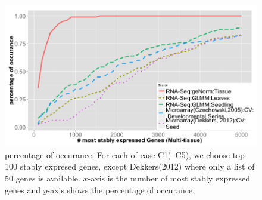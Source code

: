\documentclass[11pt, a4paper]{article}
\begin{document}

 \begin{figure}[h!]
 	\begin{center}
 		\includegraphics[scale=0.5]{Figures/rankVSrank_RNA2.png}
 		\caption{percentage of occurance. For each of case C1)--C5), we choose top 100 stably expresed genes, except Dekkers(2012) where only a list of 50 genes is available. $x$-axis is the number of most stably expressed genes and $y$-axis shows the percentage of occurance.}
	 	\label{fig:rankVSrank_RNA}
	 	\end{center}
 \end{figure}
 
\end{document}

